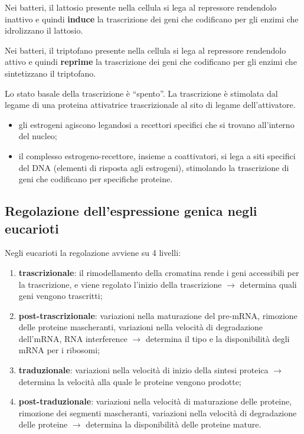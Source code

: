Nei batteri, il lattosio presente nella cellula si lega al repressore rendendolo inattivo e quindi \textbf{induce} la trascrizione dei geni che codificano per gli enzimi che idrolizzano il lattosio.

Nei batteri, il triptofano presente nella cellula si lega al repressore rendendolo attivo e quindi \textbf{reprime} la trascrizione dei geni che codificano per gli enzimi che sintetizzano il triptofano.

Lo stato basale della trascrizione è ``spento''. La trascrizione è stimolata dal legame di una proteina attivatrice trascrizionale al sito di legame dell'attivatore.

\begin{itemize}
  \item gli estrogeni agiscono legandosi a recettori specifici che si trovano all'interno del nucleo;
  \item il complesso estrogeno-recettore, insieme a coattivatori, si lega a siti specifici del DNA (elementi di risposta agli estrogeni), stimolando la trascrizione di geni che codificano per specifiche proteine.
\end{itemize}

\subsection{Regolazione dell'espressione genica negli eucarioti}

Negli eucarioti la regolazione avviene su 4 livelli:
\begin{enumerate}
  \item \textbf{trascrizionale}: il rimodellamento della cromatina rende i geni accessibili per la trascrizione, e viene regolato l'inizio della trascrizione $\rightarrow$ determina quali geni vengono trascritti;
  \item \textbf{post-trascrizionale}: variazioni nella maturazione del pre-mRNA, rimozione delle proteine mascheranti, variazioni nella velocità di degradazione dell'mRNA, RNA interference $\rightarrow$ determina il tipo e la disponibilità degli mRNA per i ribosomi;
  \item \textbf{traduzionale}: variazioni nella velocità di inizio della sintesi proteica $\rightarrow$ determina la velocità alla quale le proteine vengono prodotte;
  \item \textbf{post-traduzionale}: variazioni nella velocità di maturazione delle proteine, rimozione dei segmenti mascheranti, variazioni nella velocità di degradazione delle proteine $\rightarrow$ determina la disponibilità delle proteine mature.
\end{enumerate}
